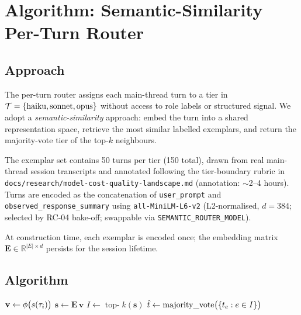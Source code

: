 \section{Algorithm: Semantic-Similarity Per-Turn Router}
\label{sec:routing}

\subsection{Approach}

The per-turn router assigns each main-thread turn to a tier in
\(\mathcal{T} = \{\text{haiku}, \text{sonnet}, \text{opus}\}\) without
access to role labels or structured signal.  We adopt a
\emph{semantic-similarity} approach: embed the turn into a shared
representation space, retrieve the most similar labelled exemplars,
and return the majority-vote tier of the top-\(k\) neighbours.

The exemplar set contains 50 turns per tier (150 total), drawn from
real \blackrim main-thread session transcripts and annotated following
the tier-boundary rubric in \texttt{docs/research/model-cost-quality-landscape.md}
(annotation: $\sim$2--4 hours).  Turns are encoded as the concatenation of
\texttt{user\_prompt} and \texttt{observed\_response\_summary} using
\texttt{all-MiniLM-L6-v2} (L2-normalised, \(d\!=\!384\); selected by RC-04
bake-off; swappable via \texttt{SEMANTIC\_ROUTER\_MODEL}).

At construction time, each exemplar is encoded once; the embedding
matrix \(\mathbf{E} \in \mathbb{R}^{|E| \times d}\) persists for the
session lifetime.

\subsection{Algorithm}

\begin{algorithm}[H]
\SetAlgoLined
\DontPrintSemicolon
{}
\BlankLine
$\mathbf{v} \gets \phi\bigl(s(\tau_i)\bigr)$
$\mathbf{s} \gets \mathbf{E}\,\mathbf{v}$
$I \gets \operatorname{top-}k(\mathbf{s})$
$\hat{t} \gets \operatorname{majority\_vote}\bigl(\{t_e : e \in I\}\bigr)$
\Return{$\hat\tier$}\;
\caption{Semantic-similarity per-turn router (conservative escalation)}
\label{alg:router}
\end{algorithm}

